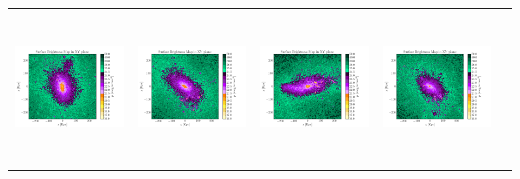 \begin{tabular}{c c c c c}
 \hspace*{-1cm}\includegraphics[height=4cm,width=4cm,trim={2.5cm 1.5cm 5cm 1.5cm},clip]{../pngs/D26.png}  & 
 \hspace*{-.3cm}\includegraphics[height=4cm,width=4cm,trim={2.5cm 1.5cm 5cm 1.5cm},clip]{../pngs/D27.png}  & 
 \hspace*{-.3cm}\includegraphics[height=4cm,width=4cm,trim={2.5cm 1.5cm 5cm 1.5cm},clip]{../pngs/D28.png}  & 
 \hspace*{-.3cm}\includegraphics[height=4cm,width=4cm,trim={2.5cm 1.5cm 5cm 1.5cm},clip]{../pngs/D29.png}  &
 \\
 
\end{tabular}


